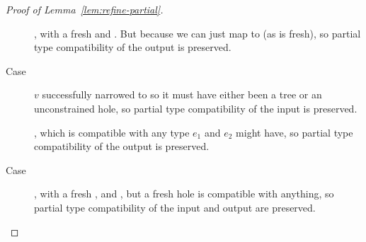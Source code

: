 \begin{proof}[Proof of Lemma~\ref{lem:refine-partial}]
\begin{description}
    , with a fresh \thole
    and . But
     because we can just map \thole to
     (as \thole is fresh), so partial type compatibility of the
    output is preserved.
  \item[Case \rulename{E-Case-Good\{1,2\}}] $v$ successfully narrowed to
    \ttree{\thole} so it must have either been a tree or an
    unconstrained hole, so partial type compatibility of the input is
    preserved.

    , which is
    compatible with any type $e_1$ and $e_2$ might have, so partial type
    compatibility of the output is preserved.
  \item[Case \reholegood] \hastype{\ehole}{\thole}, with a fresh \thole,
    and \hastype{\vhole{\thole}}{\thole}, but a fresh hole is compatible
    with anything, so partial type compatibility of the input and output
    are preserved.
  \end{description}
\end{proof}


